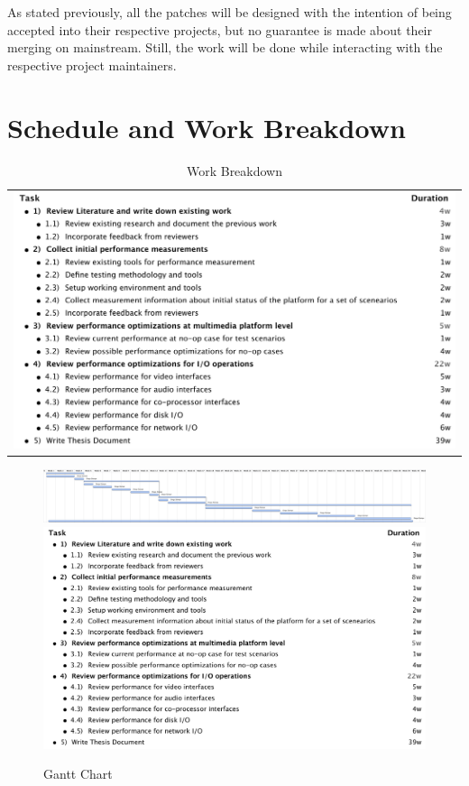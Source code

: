 As stated previously, all the patches will be designed with the intention of being accepted into their respective projects, but no guarantee is made about their merging on mainstream. Still, the work will be done while interacting with the respective project maintainers.

\newpage
\section{Schedule and Work Breakdown}

\begin{table}[tph]
\caption{Work Breakdown} \centering
\begin{tabular}{c}
\includegraphics[width=1.0\textwidth]{images/Outline.pdf}
\end{tabular}
\end{table}

\begin{figure}[tbh]
\centering
\includegraphics[width=0.55\textheight,height=0.34\textwidth,angle=90]{images/Gantt.pdf}\\
\includegraphics[width=0.4\textheight,angle=90]{images/Outline.pdf}
\caption{Gantt Chart}\label{gantt}
\end{figure}
